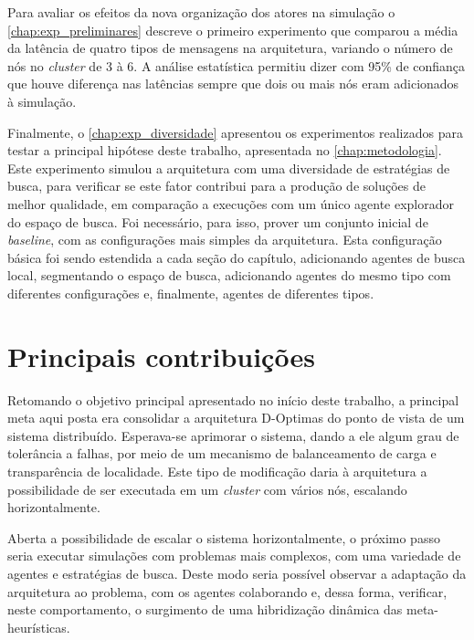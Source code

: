 Para avaliar os efeitos da nova organização dos atores na simulação o \autoref{chap:exp_preliminares} descreve o primeiro experimento  que comparou a média da latência de quatro tipos de mensagens na arquitetura, variando o número de nós no \textit{cluster}  de 3 à 6. A análise estatística permitiu dizer com 95\% de confiança que houve diferença nas latências sempre que dois ou mais nós eram adicionados à simulação. 

Finalmente, o \autoref{chap:exp_diversidade} apresentou os experimentos realizados para testar a principal hipótese deste trabalho, apresentada no \autoref{chap:metodologia}. Este experimento simulou a arquitetura com uma diversidade de estratégias de busca, para verificar se este fator contribui para a produção de soluções de melhor qualidade, em comparação a execuções com um único agente explorador do espaço de busca. Foi necessário, para isso, prover um conjunto inicial de \textit{baseline}, com as configurações mais simples da arquitetura. Esta configuração básica foi sendo estendida a cada seção do capítulo, adicionando agentes de busca local, segmentando o espaço de busca, adicionando agentes do mesmo tipo com diferentes configurações e, finalmente, agentes de diferentes tipos.   

\section{Principais contribuições}

Retomando o objetivo principal apresentado no início deste trabalho, a principal meta aqui posta era consolidar a arquitetura D-Optimas do ponto de vista de um sistema distribuído. Esperava-se aprimorar o sistema, dando a ele algum grau de tolerância a falhas, por meio de um mecanismo de balanceamento de carga e transparência de localidade. Este tipo de modificação daria à arquitetura a possibilidade de ser executada em um \textit{cluster} com vários nós, escalando horizontalmente. 

Aberta a possibilidade de escalar o sistema horizontalmente, o próximo passo seria executar simulações com problemas mais complexos, com uma variedade de agentes e estratégias de busca. Deste modo seria possível observar a adaptação da arquitetura ao problema, com os agentes colaborando e, dessa forma, verificar, neste comportamento,  o surgimento de uma hibridização dinâmica das meta-heurísticas.

